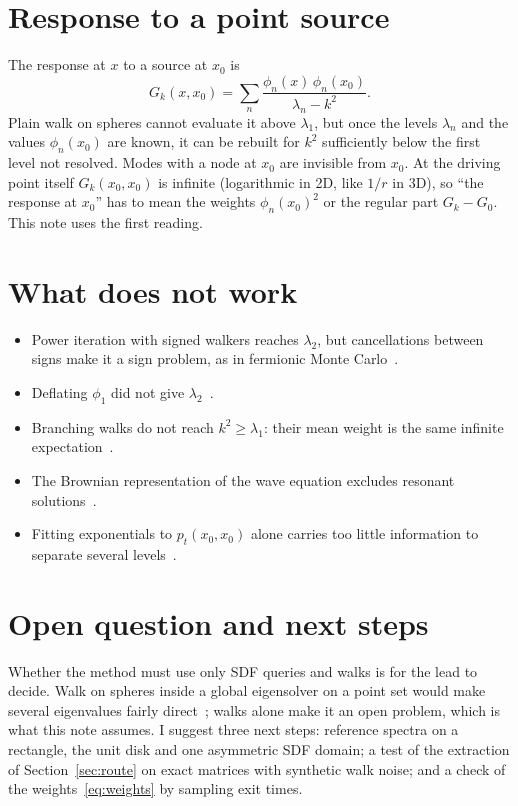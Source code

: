 \documentclass{article}
\begin{document}
\section{Response to a point source}
The response at $x$ to a source at $x_0$ is
\begin{equation}
G_k(x,x_0)=\sum_n\frac{\phi_n(x)\,\phi_n(x_0)}{\lambda_n-k^2}.
\end{equation}
Plain walk on spheres cannot evaluate it above $\lambda_1$, but once the levels $\lambda_n$ and the values $\phi_n(x_0)$ are known, it can be rebuilt for $k^2$ sufficiently below the first level not resolved. Modes with a node at $x_0$ are invisible from $x_0$. At the driving point itself $G_k(x_0,x_0)$ is infinite (logarithmic in 2D, like $1/r$ in 3D), so ``the response at $x_0$'' has to mean the weights $\phi_n(x_0)^2$ or the regular part $G_k-G_0$. This note uses the first reading.

\section{What does not work}
\begin{itemize}
\item Power iteration with signed walkers reaches $\lambda_2$, but cancellations between signs make it a sign problem, as in fermionic Monte Carlo~\cite{booth2008}.
\item Deflating $\phi_1$ did not give $\lambda_2$~\cite{lejay2008}.
\item Branching walks do not reach $k^2\ge\lambda_1$: their mean weight is the same infinite expectation~\cite{lejay2008}.
\item The Brownian representation of the wave equation excludes resonant solutions~\cite{chatterjee2013}.
\item Fitting exponentials to $p_t(x_0,x_0)$ alone carries too little information to separate several levels~\cite{ceperley1988}.
\end{itemize}

\section{Open question and next steps}
Whether the method must use only SDF queries and walks is for the lead to decide. Walk on spheres inside a global eigensolver on a point set would make several eigenvalues fairly direct~\cite{shardlow2018,cimpean2026}; walks alone make it an open problem, which is what this note assumes. I suggest three next steps: reference spectra on a rectangle, the unit disk and one asymmetric SDF domain; a test of the extraction of Section~\ref{sec:route} on exact matrices with synthetic walk noise; and a check of the weights~\eqref{eq:weights} by sampling exit times.


\end{document}
